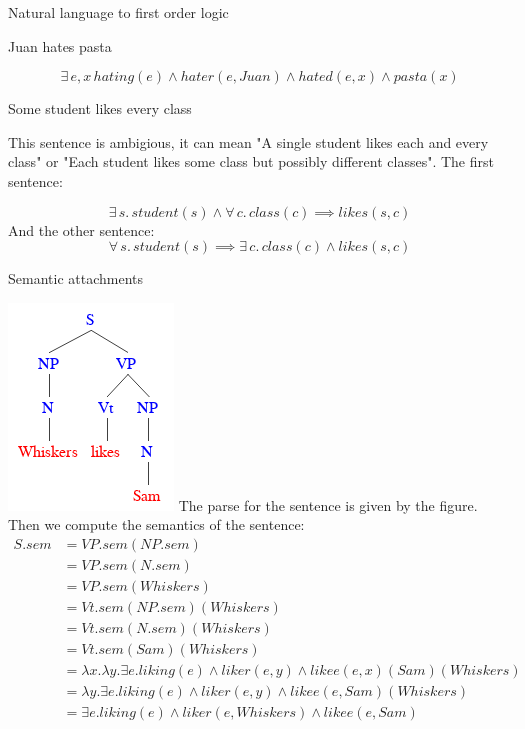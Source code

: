 \documentclass[12pt]{article}
\newenvironment{question}[2][Question]{\begin{trivlist}
\item[\hskip \labelsep {\bfseries #1}\hskip \labelsep {\bfseries #2.}]}{\end{trivlist}}
\newenvironment{answer}[2][Answer]{\begin{trivlist}
\item[\hskip \labelsep {\bfseries #1}\hskip \labelsep {\bfseries #2:}]}{\end{trivlist}}
\begin{document}
\begin{question}{4}
Natural language to first order logic
\end{question}

\begin{answer}{a)}{Juan hates pasta}

$$\exists\, e,x \, hating(e) \land hater(e, Juan) \land hated(e, x) \land pasta(x) $$
\end{answer}
\begin{answer}{b)}{Some student likes every class}

This sentence is ambigious, it can mean "A single student likes each and every class" or "Each student likes some class but possibly different classes". The first sentence:

$$\exists \, s. \, student(s) \land \forall \, c. \, class(c) \implies likes(s,c)$$
And the other sentence:
$$\forall \, s. \, student(s) \implies \exists \, c. \, class(c) \land likes(s,c)$$
\end{answer}

\begin{question}{5}
Semantic attachments
\end{question}
\begin{answer}{a)}{}

\includegraphics[scale=0.5]{sem_parse_grapg}
The parse for the sentence is given by the figure. Then we compute the semantics of the sentence:
\begin{align*}
S.sem &=VP.sem(NP.sem) \\
&=VP.sem(N.sem) \\
&=VP.sem(Whiskers) \\
&=Vt.sem(NP.sem)(Whiskers) \\
&=Vt.sem(N.sem)(Whiskers) \\
&=Vt.sem(Sam)(Whiskers) \\
&=\lambda x.\lambda y. \exists e. liking(e) \land liker(e,y) \land likee(e,x)(Sam)(Whiskers) \\
&=\lambda y. \exists e. liking(e) \land liker(e,y) \land likee(e,Sam)(Whiskers) \\
&=\exists e. liking(e) \land liker(e,Whiskers) \land likee(e,Sam) \\
\end{align*}

\end{answer}
\end{document}

